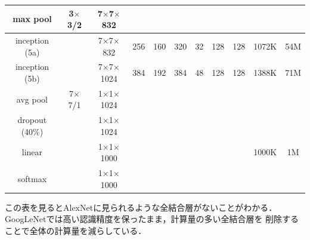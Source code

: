 {\begin{table}[p]
\begin{center}
\begin{tabular}{|c|c|c|c|c|c|c|c|c|c|c|}
  max pool       & 3$\times$3/2 & 7$\times$7$\times$832 &  &  &  &  &  &  &  &  \\ \hline
  inception (5a) &  & 7$\times$7$\times$832 & 256 & 160 & 320 & 32 & 128 & 128 & 1072K & 54M \\ \hline
  inception (5b) &  & 7$\times$7$\times$1024 & 384 & 192 & 384 & 48 & 128 & 128 & 1388K & 71M \\ \hline
  avg pool       & 7$\times$7/1 & 1$\times$1$\times$1024 &  &  &  &  &  &  &  &  \\ \hline
  dropout (40\%) &  & 1$\times$1$\times$1024 &  &  &  &  &  &  &  &  \\ \hline
  linear         &  & 1$\times$1$\times$1000 &  &  &  &  &  &  & 1000K & 1M \\ \hline
  softmax        &  & 1$\times$1$\times$1000 &  &  &  &  &  &  &  &  \\ \hline
  \end{tabular}
  \end{center}
\end{table}
  

この表を見るとAlexNetに見られるような全結合層がないことがわかる．GoogLeNetでは高い認識精度を保ったまま，計算量の多い全結合層を
削除することで全体の計算量を減らしている．
}